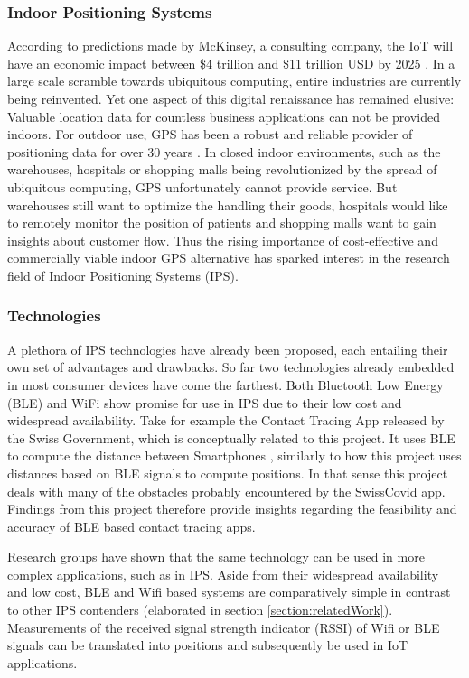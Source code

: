 \documentclass[a4paper, oneside]{ipsreport}
\begin{document}
\subsubsection{Indoor Positioning Systems}
According to predictions made by McKinsey, a consulting company, the IoT will have an economic impact between \$4 trillion and \$11 trillion USD by 2025 \autocite{McKinsey}. In a large scale scramble towards ubiquitous computing, entire industries are currently being reinvented. Yet one aspect of this digital renaissance has remained elusive: Valuable location data for countless business applications can not be provided indoors. For outdoor use, GPS has been a robust and reliable provider of positioning data for over 30 years \autocite{wiki:GPS}. In closed indoor environments, such as the warehouses, hospitals or shopping malls being revolutionized by the spread of ubiquitous computing, GPS unfortunately cannot provide service. But warehouses still want to optimize the handling their goods, hospitals would like to remotely monitor the position of patients and shopping malls want to gain insights about customer flow. Thus the rising importance of cost-effective and commercially viable indoor GPS alternative has sparked interest in the research field of Indoor Positioning Systems (IPS).

\subsubsection{Technologies}
A plethora of IPS technologies have already been proposed, each entailing their own set of advantages and drawbacks. So far two technologies already embedded in most consumer devices have come the farthest. Both Bluetooth Low Energy (BLE) and WiFi show promise for use in IPS due to their low cost and widespread availability. Take for example the Contact Tracing App released by the Swiss Government, which is conceptually related to this project. It uses BLE to compute the distance between Smartphones \autocite{SwissCovid}, similarly to how this project uses distances based on BLE signals to compute positions. In that sense this project deals with many of the obstacles probably encountered by the SwissCovid app. Findings from this project therefore provide insights regarding the feasibility and accuracy of BLE based contact tracing apps.

Research groups have shown that the same technology can be used in more complex applications, such as in IPS. Aside from their widespread availability and low cost, BLE and Wifi based systems are comparatively simple in contrast to other IPS contenders (elaborated in section \ref{section:relatedWork}). Measurements of the received signal strength indicator (RSSI) of Wifi or BLE signals can be translated into positions and subsequently be used in IoT applications.
\end{document}

